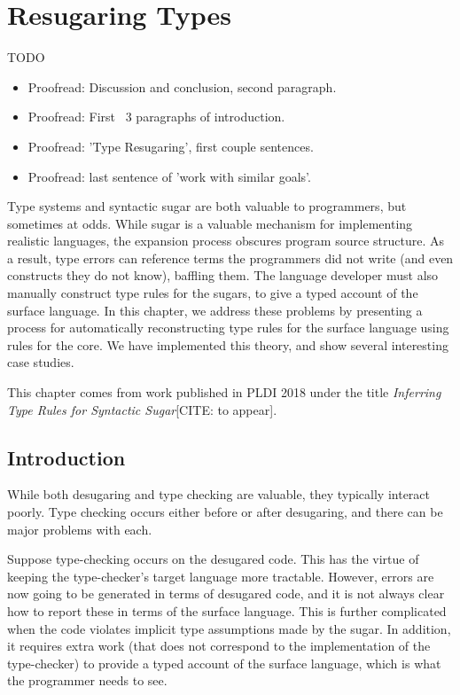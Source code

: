 \chapter{Resugaring Types}\label{chap:resugar-types}

TODO
\begin{itemize}
\item Proofread: Discussion and conclusion, second paragraph.
\item Proofread: First ~3 paragraphs of introduction.
\item Proofread: 'Type Resugaring', first couple sentences.
\item Proofread: last sentence of 'work with similar goals'.
\end{itemize}

\newcommand{\reflem}[1]{lemma \ref{lemma:rtype-#1} (#1)}
\newcommand{\Reflem}[1]{Lemma \ref{lemma:rtype-#1} (#1)}
\newcommand{\refass}[1]{assumption \ref{assumption:rtype-#1} (#1)}
\newcommand{\Refass}[1]{Assumption \ref{assumption:rtype-#1} (#1)}


Type systems and syntactic sugar are both valuable to programmers, but
sometimes at odds. While sugar is a valuable mechanism for
implementing realistic languages, the expansion process obscures
program source structure. As a result, type errors can reference terms
the programmers did not write (and even constructs they do not know),
baffling them. The language developer must also manually construct
type rules for the sugars, to give a typed account of the surface
language. In this chapter, we address these problems by presenting a
process for automatically reconstructing type rules for the surface
language using rules for the core. We have implemented this theory,
and show several interesting case studies.

This chapter comes from work published in PLDI 2018 under the
title \emph{Inferring Type Rules for Syntactic Sugar}[CITE: to appear].

\section{Introduction}

While both desugaring and type checking are valuable, they typically
interact poorly. Type checking occurs either before or after
desugaring, and there can be major problems with each.

Suppose type-checking occurs on the desugared code. This has the
virtue of keeping the type-checker's target language more
tractable. However, errors are now going to be generated in terms of
desugared code, and it is not always clear how to report these in
terms of the surface language. This is further complicated when the
code violates implicit type assumptions made by the sugar. In
addition, it requires extra work (that does not correspond to the
implementation of the type-checker) to provide a typed account of the
surface language, which is what the programmer needs to see.

